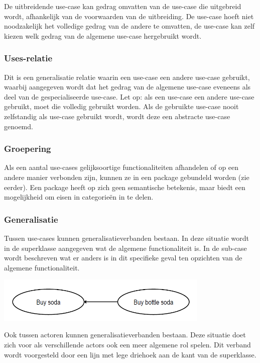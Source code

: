 De uitbreidende use-case kan gedrag omvatten van de use-case die uitgebreid wordt, afhankelijk van de voorwaarden van de uitbreiding. De use-case hoeft niet noodzakelijk het volledige gedrag van de andere te omvatten, de use-case kan zelf kiezen welk gedrag van de algemene use-case hergebruikt wordt.

\subsubsection{Uses-relatie}

Dit is een generalisatie relatie waarin een use-case een andere use-case gebruikt, waarbij aangegeven wordt dat het gedrag van de algemene use-case eveneens als deel van de gespecialiseerde use-case. Let op: als een use-case een andere use-case gebruikt, moet die volledig gebruikt worden. Als de gebruikte use-case nooit zelfstandig als use-case gebruikt wordt, wordt deze een abstracte use-case genoemd.

\subsubsection{Groepering}

Als een aantal use-cases gelijksoortige functionaliteiten afhandelen of op een andere manier verbonden zijn, kunnen ze in een package gebundeld worden (zie eerder).
Een package heeft op zich geen semantische betekenis, maar biedt een mogelijkheid om eisen in categorieën in te delen.
\newpage
\subsubsection{Generalisatie}
Tussen use-cases kunnen generalisatieverbanden bestaan. In deze situatie wordt in de superklasse aangegeven wat de algemene functionaliteit is. In de sub-case wordt beschreven wat er anders is in dit specifieke geval ten opzichten van de algemene functionaliteit.


\begin{center}
\includegraphics[width=4in]{img/generalisatie}%
\end{center}

Ook tussen actoren kunnen generalisatieverbanden bestaan. Deze situatie doet zich voor als verschillende actors ook een meer algemene rol spelen. Dit verband wordt voorgesteld door een lijn met lege driehoek aan de kant van de superklasse.

